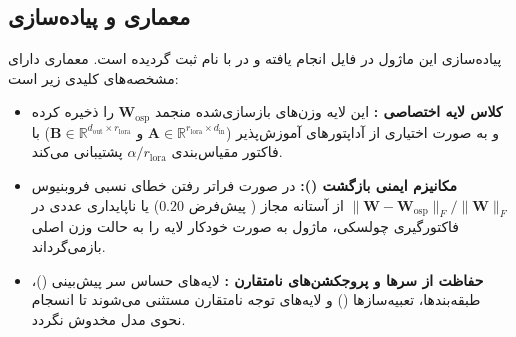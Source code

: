 \subsection{معماری و پیاده‌سازی}
پیاده‌سازی این ماژول در فایل  انجام یافته و در  با نام  ثبت گردیده است. معماری دارای مشخصه‌های کلیدی زیر است:
\begin{itemize}
    \item \textbf{کلاس لایه اختصاصی :} این لایه وزن‌های بازسازی‌شده منجمد $\mathbf{W}_{\text{osp}}$ را ذخیره کرده و به صورت اختیاری از آداپتورهای آموزش‌پذیر  ($\mathbf{A} \in \mathbb{R}^{r_{\text{lora}} \times d_{\text{in}}}$ و $\mathbf{B} \in \mathbb{R}^{d_{\text{out}} \times r_{\text{lora}}}$) با فاکتور مقیاس‌بندی $\alpha / r_{\text{lora}}$ پشتیبانی می‌کند.
    \item \textbf{مکانیزم ایمنی بازگشت ():} در صورت فراتر رفتن خطای نسبی فروبنیوس $\|\mathbf{W} - \mathbf{W}_{\text{osp}}\|_F / \|\mathbf{W}\|_F$ از آستانه مجاز ( پیش‌فرض $0.20$) یا ناپایداری عددی در فاکتورگیری چولسکی، ماژول به صورت خودکار لایه را به حالت وزن اصلی بازمی‌گرداند.
    \item \textbf{حفاظت از سرها و پروجکشن‌های نامتقارن :} لایه‌های حساس سر پیش‌بینی ()، طبقه‌بندها، تعبیه‌سازها () و لایه‌های توجه نامتقارن  مستثنی می‌شوند تا انسجام نحوی مدل مخدوش نگردد.
\end{itemize}
